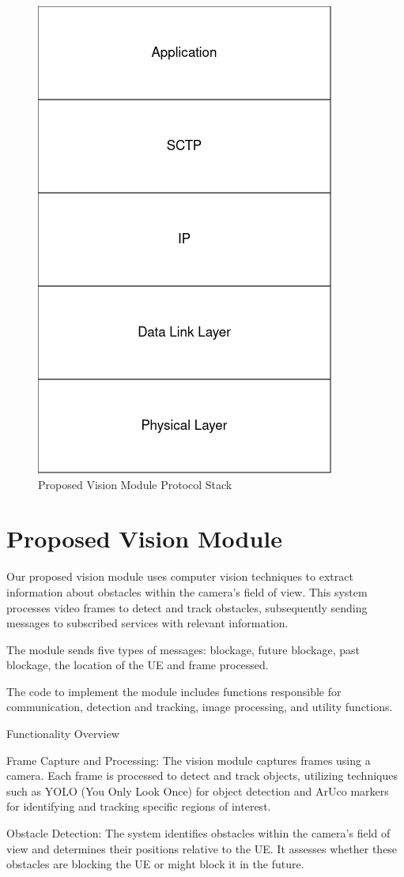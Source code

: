 \begin{figure}[H]
    \centering
    \includegraphics[width=0.35\linewidth]{figures/VisionModule_ProtocolStack.drawio(2)}
    \caption[Proposed Vision Module Protocol Stack]{Proposed Vision Module Protocol Stack}
    \label{fig:stack}
\end{figure}



\section{Proposed Vision Module}\label{sec:prop_vision}
Our proposed vision module uses computer vision techniques to extract information about obstacles within the camera's field of view. This system processes video frames to detect and track obstacles, subsequently sending messages to subscribed services with relevant information.

The module sends five types of messages: blockage, future blockage, past blockage, the location of the UE and frame processed.

The code to implement the module includes functions responsible for communication, detection and tracking, image processing, and utility functions.

Functionality Overview

    Frame Capture and Processing:
        The vision module captures frames using a camera.
        Each frame is processed to detect and track objects, utilizing techniques such as YOLO (You Only Look Once) for object detection and ArUco markers for identifying and tracking specific regions of interest.

    Obstacle Detection:
        The system identifies obstacles within the camera's field of view and determines their positions relative to the UE.
        It assesses whether these obstacles are blocking the UE or might block it in the future.

